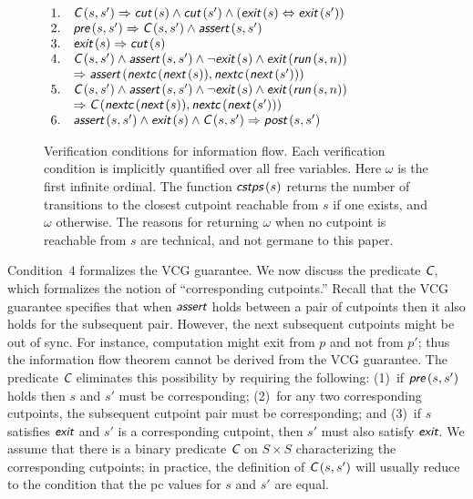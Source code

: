 \documentclass[conference]{IEEEtran}
\newcommand{\func}[1]{\ensuremath{\mbox{{\sf {\em #1}}}}}
\begin{document}
\begin{figure}
{\begin{minipage}{3.3in}
\begin{math}
\begin{array}{ll}
1. & \func{C}\,(s,s')\Rightarrow\func{cut}\,(s) \wedge \func{cut}\,(s') \wedge (\func{exit}\,(s)\Leftrightarrow\func{exit}\,(s'))\\
2. & \func{pre}\,(s,s')\Rightarrow\func{C}\,(s,s') \wedge \func{assert}\,(s,s')\\
3. & \func{exit}\,(s) \Rightarrow \func{cut}\,(s) \\
4. & \func{C}\,(s,s')\wedge\func{assert}\,(s,s')\wedge\neg\func{exit}\,(s) \wedge\func{exit}\,(\func{run}\,(s,n))\\
& \Rightarrow\func{assert}\,(\func{nextc}\,(\func{next}\,(s)),\func{nextc}\,(\func{next}\,(s'))) \\
5. & \func{C}\,(s,s')\wedge\func{assert}\,(s,s') \wedge\neg\func{exit}\,(s) \wedge\func{exit}\,(\func{run}\,(s,n)) \\
& \Rightarrow\func{C}\,(\func{nextc}\,(\func{next}\,(s)),\func{nextc}\,(\func{next}\,(s'))) \\
6. & \func{assert}\,(s,s')\wedge\func{exit}\,(s)\wedge\func{C}\,(s,s')\Rightarrow\func{post}\,(s,s') 
\end{array}
\end{math}
\end{minipage}
}
\caption{Verification conditions for information flow.  Each
verification condition is implicitly quantified over all free
variables.  Here $\omega$ is the first infinite ordinal.  The function
$\func{cstps}\,(s)$ returns the number of transitions to the closest
cutpoint reachable from $s$ if one exists, and $\omega$ otherwise.
The reasons for returning $\omega$ when no cutpoint is reachable from
$s$ are technical, and not germane to this paper.}
\label{fig:vcg}
\end{figure}
Condition~$4$ formalizes the VCG guarantee.  We now discuss the
predicate \func{C}, which formalizes the notion of ``corresponding
cutpoints.''  Recall that the VCG guarantee specifies that when
\func{assert} holds between a pair of cutpoints then it also holds for
the subsequent pair.  However, the next subsequent cutpoints might be
out of sync.  For instance, computation might exit from $p$ and not
from $p'$; thus the information flow theorem cannot be derived from
the VCG guarantee.  The predicate \func{C} eliminates this possibility
by requiring the following: (1)~if $\func{pre}\,(s,s')$ holds then $s$
and $s'$ must be corresponding; (2)~for any two corresponding
cutpoints, the subsequent cutpoint pair must be corresponding; and
(3)~if $s$ satisfies \func{exit} and $s'$ is a corresponding cutpoint,
then $s'$ must also satisfy \func{exit}.  We assume that there is a
binary predicate \func{C} on $S\times S$ characterizing the
corresponding cutpoints; in practice, the definition of
$\func{C}\,(s,s')$ will usually reduce to the condition that the pc
values for $s$ and $s'$ are equal.
\end{document}
